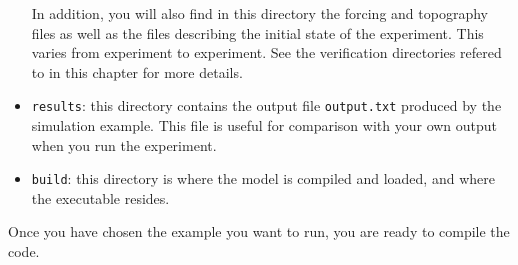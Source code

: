 \begin{itemize}
  In addition, you will also find in this directory the forcing and
  topography files as well as the files describing the initial state
  of the experiment.  This varies from experiment to experiment. See
  the verification directories refered to in this chapter for more details.

\item \texttt{results}: this directory contains the output file
  \texttt{output.txt} produced by the simulation example. This file is
  useful for comparison with your own output when you run the
  experiment.

\item \texttt{build}: this directory is where the model is compiled
  and loaded, and where the executable resides.

\end{itemize}

Once you have chosen the example you want to run, you are ready to
compile the code.


\newpage


\newpage


\newpage


\newpage


\newpage


\newpage


\newpage


\newpage


\newpage


\newpage


\newpage


\newpage


\newpage

